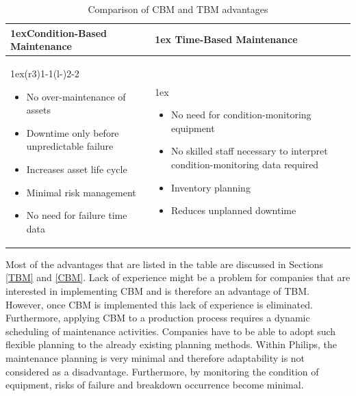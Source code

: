 \begin{table}[ht]
\caption{Comparison of CBM and TBM advantages}
\label{tab:Comparison CBM and TBM}
\begin{tabularx}{\linewidth}{>{\parskip1ex}X@{\kern4\tabcolsep}>{\parskip1ex}X}
\hfil\bfseries Condition-Based Maintenance
&
\hfil\bfseries Time-Based Maintenance\\
\cmidrule(r{3\tabcolsep}){1-1}\cmidrule(l{-\tabcolsep}){2-2}
\begin{itemize}
\item No over-maintenance of assets
\item Downtime only before unpredictable failure
\item Increases asset life cycle
\item Minimal risk management
\item No need for failure time data
\end{itemize}
&
\begin{itemize}
\item No need for condition-monitoring equipment
\item No skilled staff necessary to interpret condition-monitoring data required
\item Inventory planning
\item Reduces unplanned downtime
\end{itemize}\\
\end{tabularx}
\end{table}
Most of the advantages that are listed in the table are discussed in Sections \ref{TBM} and \ref{CBM}. Lack of experience might be a problem for companies that are interested in implementing CBM \parencite{ZIO2013} and is therefore an advantage of TBM. However, once CBM is implemented this lack of experience is eliminated. Furthermore, applying CBM to a production process requires a dynamic scheduling of maintenance activities. Companies have to be able to adopt such flexible planning to the already existing planning methods. Within Philips, the maintenance planning is very minimal and therefore adaptability is not considered as a disadvantage. Furthermore, by monitoring the condition of equipment, risks of failure and breakdown occurrence become minimal.

